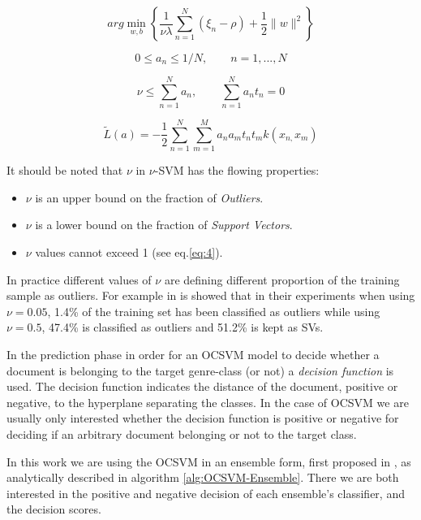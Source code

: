 \begin{equation}\label{eq:3}
	arg\min_{w,b}\left\{ \frac{1}{\nu\lambda}\sum_{n=1}^{N}(\xi_{n}-\rho)+\frac{1}{2}\|w\|^{2}\right\}
\end{equation}

\begin{equation}\label{eq:4}
	0\leqslant a_{n}\leqslant1/N,\qquad n=1,...,N
\end{equation}

\begin{equation}\label{eq:5}
	\nu\leqslant\sum_{n=1}^{N}a_{n}, \qquad \sum_{n=1}^{N}a_{n}t_{n}=0
\end{equation}

\begin{equation}\label{eq:12}
	\widetilde{L}(a)=-\frac{1}{2}\sum_{n=1}^{N}\sum_{m=1}^{M}a_{n}a_{m}t_{n}t_{m}k(x_{n,}x_{m})
\end{equation}

\newpage


It should be noted that $\nu$ in $\nu$-SVM has the flowing properties:
\begin{itemize}
	\item $\nu$ is an upper bound on the fraction of \textit{Outliers}.
	\item $\nu$ is a lower bound on the fraction of \textit{Support Vectors}.
	\item $\nu$ values cannot exceed 1 (see eq.\ref{eq:4}).
\end{itemize}

In practice different values of $\nu$ are defining different proportion of the training sample as outliers. For example in  is showed that in their experiments when using $\nu=0.05$, 1.4\% of the training set has been classified as outliers while using $\nu=0.5$, 47.4\% is classified as outliers and 51.2\% is kept as SVs.

In the prediction phase in order for an OCSVM model to decide whether a document is belonging to the target genre-class (or not) a \textit{decision function} is used. The decision function indicates the distance of the document, positive or negative, to the hyperplane separating the classes. In the case of OCSVM we are usually only interested whether the decision function is positive or negative for deciding if an arbitrary document belonging or not to the target class.

In this work we are using the OCSVM in an ensemble form, first proposed in , as analytically described in algorithm \ref{alg:OCSVM-Ensemble}. There we are both interested in the positive and negative decision of each ensemble's classifier, and the decision scores.

